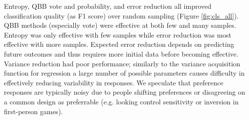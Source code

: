 \documentclass{sig-alternate}
\begin{document}
\begin{table}[tb]
%
\label{tab:cls_expr}
\end{table}

Entropy, QBB vote and probability, and error reduction all improved classification quality (as F1 score) over random sampling (Figure \ref{fig:cls_all}).
QBB methods (especially vote) were effective at both few and many samples.
Entropy was only effective with few samples while error reduction was most effective with more samples.
Expected error reduction depends on predicting future outcomes and thus requires more initial data before becoming effective.
Variance reduction had poor performance; similarly to the variance acquisition function for regression a large number of possible parameters causes difficulty in effectively reducing variability in responses.
We speculate that preference responses are typically noisy due to people shifting preferences or disagreeing on a common design as preferrable (e.g. looking control sensitivity or inversion in first-person games).
\end{document}
